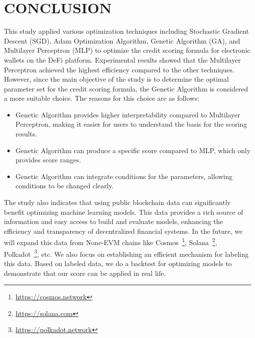 \documentclass[../ICIT-Paper-2024.tex]{subfiles}
\begin{document}
\section{CONCLUSION}\label{section5}
This study applied various optimization techniques including Stochastic Gradient Descent (SGD), Adam Optimization Algorithm, Genetic Algorithm (GA), and Multilayer Perceptron (MLP) to optimize the credit scoring formula for electronic wallets on the DeFi platform. Experimental results showed that the Multilayer Perceptron achieved the highest efficiency compared to the other techniques. However, since the main objective of the study is to determine the optimal parameter set for the credit scoring formula, the Genetic Algorithm is considered a more suitable choice. The reasons for this choice are as follows:

\begin{itemize} \item Genetic Algorithm provides higher interpretability compared to Multilayer Perceptron, making it easier for users to understand the basis for the scoring results. \item Genetic Algorithm can produce a specific score compared to MLP, which only provides score ranges. \item Genetic Algorithm can integrate conditions for the parameters, allowing conditions to be changed clearly.  \end{itemize}

The study also indicates that using public blockchain data can significantly benefit optimizing machine learning models. This data provides a rich source of information and easy access to build and evaluate models, enhancing the efficiency and transparency of decentralized financial systems. In the future, we will expand this data from None-EVM chains like Cosmos~\footnote{\href{https://cosmos.network/}{https://cosmos.network}}, Solana~\footnote{\href{https://solana.com/}{https://solana.com}}, Polkadot~\footnote{\href{https://polkadot.network/}{https://polkadot.network}}, etc. We also focus on establishing an efficient mechanism for labeling this data. Based on labeled data, we do a backtest for optimizing models to demonstrate that our score can be applied in real life.
\end{document}
